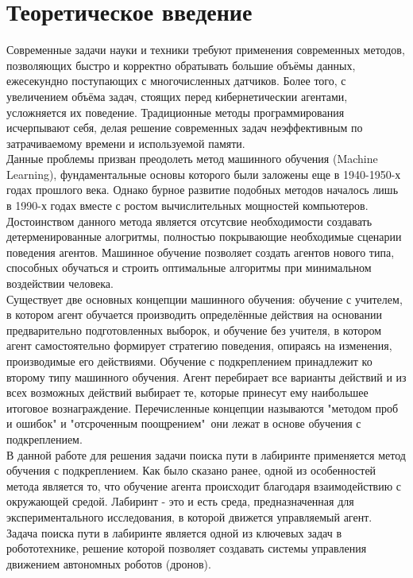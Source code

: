 \documentclass[12pt, a4paper]{report}
\theoremstyle{definition}
\theoremstyle{plain}
\theoremstyle{remark}
\theoremstyle{remark}
\theoremstyle{definition}
\begin{document}
\newpage
\section{Теоретическое введение}
\label{sec:W1}
Современные задачи науки и техники требуют применения современных методов, позволяющих быстро и корректно обратывать большие объёмы данных, ежесекундно поступающих с многочисленных датчиков. Более того, с увеличением объёма задач, стоящих перед кибернетическии агентами, усложняется их поведение. Традиционные методы программирования исчерпывают себя, делая решение современных задач неэффективным по затрачиваемому времени и используемой памяти.\\

Данные проблемы призван преодолеть метод машинного обучения (Machine Learning), фундаментальные основы которого были заложены еще в 1940-1950-х годах прошлого века. Однако бурное развитие подобных методов началось лишь в 1990-х годах вместе с ростом вычислительных мощностей компьютеров.
Достоинством данного метода является отсутсвие необходимости создавать детерменированные алогритмы, полностью покрывающие необходимые сценарии поведения агентов. Машинное обучение позволяет создать агентов нового типа, способных обучаться и строить оптимальные алгоритмы при минимальном воздействии человека.\\

Существует две основных концепции машинного обучения: обучение с учителем, в котором агент обучается производить определённые действия на основании предварительно подготовленных выборок, и обучение без учителя, в котором агент самостоятельно формирует стратегию поведения, опираясь на изменения, производимые его действиями. Обучение с подкреплением принадлежит ко второму типу машинного обучения. Агент перебирает все варианты действий и из всех возможных действий выбирает те, которые принесут ему наибольшее итоговое вознаграждение. Перечисленные концепции называются "методом проб и ошибок" и "отсроченным поощрением"\, они лежат в основе обучения с подкреплением.\\

В данной работе для решения задачи поиска пути в лабиринте применяется метод обучения с подкреплением. Как было сказано ранее, одной из особенностей метода является то, что обучение агента происходит благодаря взаимодействию с окружающей средой. Лабиринт - это и есть среда, предназначенная для экспериментального исследования, в которой движется управляемый агент. Задача поиска пути в лабиринте является одной из ключевых задач в робототехнике, решение которой позволяет создавать системы управления движением автономных роботов (дронов). \\
\end{document}
